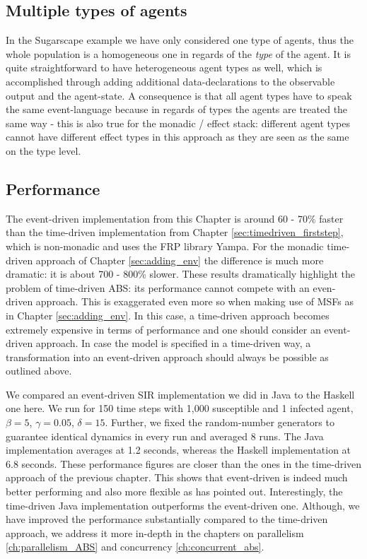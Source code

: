 \subsection{Multiple types of agents}
In the Sugarscape example we have only considered one type of agents, thus the whole population is a homogeneous one in regards of the \textit{type} of the agent. It is quite straightforward to have heterogeneous agent types as well, which is accomplished through adding additional data-declarations to the observable output and the agent-state. A consequence is that all agent types have to speak the same event-language because in regards of types the agents are treated the same way - this is also true for the monadic / effect stack: different agent types cannot have different effect types in this approach as they are seen as the same on the type level.

\subsection{Performance}
The event-driven implementation from this Chapter is around 60 - 70\% faster than the time-driven implementation from Chapter \ref{sec:timedriven_firststep}, which is non-monadic and uses the FRP library Yampa. For the monadic time-driven approach of Chapter \ref{sec:adding_env} the difference is much more dramatic: it is about 700 - 800\% slower. These results dramatically highlight the problem of time-driven ABS: its performance cannot compete with an even-driven approach. This is exaggerated even more so when making use of MSFs as in Chapter \ref{sec:adding_env}. In this case, a time-driven approach becomes extremely expensive in terms of performance and one should consider an event-driven approach. In case the model is specified in a time-driven way, a transformation into an event-driven approach should always be possible as outlined above.

We compared an event-driven SIR implementation we did in Java to the Haskell one here. We run for 150 time steps with 1,000 susceptible and 1 infected agent, $\beta = 5$, $\gamma = 0.05$, $\delta = 15$. Further, we fixed the random-number generators to guarantee identical dynamics in every run and averaged 8 runs. The Java implementation averages at 1.2 seconds, whereas the Haskell implementation at 6.8 seconds. These performance figures are closer than the ones in the time-driven approach of the previous chapter. This shows that event-driven is indeed much better performing and also more flexible as \cite{meyer_event-driven_2014} has pointed out. Interestingly, the time-driven Java implementation outperforms the event-driven one. Although, we have improved the performance substantially compared to the time-driven approach, we address it more in-depth in the chapters on parallelism \ref{ch:parallelism_ABS} and concurrency \ref{ch:concurrent_abs}.

